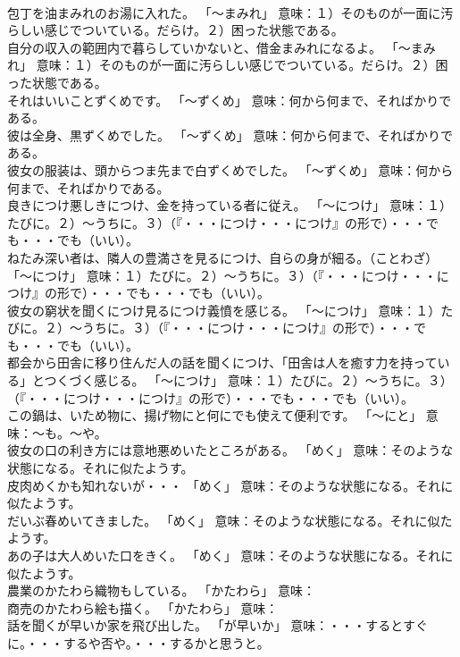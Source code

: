 \documentclass[8pt]{extreport}
\begin{document}
\begin{CJK}{UTF8}{min}
\\	包丁を油まみれのお湯に入れた。	「～まみれ」 意味：１）そのものが一面に汚らしい感じでついている。だらけ。２）困った状態である。	
\\	自分の収入の範囲内で暮らしていかないと、借金まみれになるよ。	「～まみれ」 意味：１）そのものが一面に汚らしい感じでついている。だらけ。２）困った状態である。	
\\	それはいいことずくめです。	「～ずくめ」 意味：何から何まで、そればかりである。	
\\	彼は全身、黒ずくめでした。	「～ずくめ」 意味：何から何まで、そればかりである。	
\\	彼女の服装は、頭からつま先まで白ずくめでした。	「～ずくめ」 意味：何から何まで、そればかりである。	
\\	良きにつけ悪しきにつけ、金を持っている者に従え。	「～につけ」 意味：１）たびに。２）～うちに。３）（『・・・につけ・・・につけ』の形で）・・・でも・・・でも（いい）。	
\\	ねたみ深い者は、隣人の豊満さを見るにつけ、自らの身が細る。（ことわざ）	「～につけ」 意味：１）たびに。２）～うちに。３）（『・・・につけ・・・につけ』の形で）・・・でも・・・でも（いい）。	
\\	彼女の窮状を聞くにつけ見るにつけ義憤を感じる。	「～につけ」 意味：１）たびに。２）～うちに。３）（『・・・につけ・・・につけ』の形で）・・・でも・・・でも（いい）。	
\\	都会から田舎に移り住んだ人の話を聞くにつけ、「田舎は人を癒す力を持っている」とつくづく感じる。	「～につけ」 意味：１）たびに。２）～うちに。３）（『・・・につけ・・・につけ』の形で）・・・でも・・・でも（いい）。	
\\	この鍋は、いため物に、揚げ物にと何にでも使えて便利です。	「～にと」 意味：～も。～や。	
\\	彼女の口の利き方には意地悪めいたところがある。	「めく」 意味：そのような状態になる。それに似たようす。	
\\	皮肉めくかも知れないが・・・	「めく」 意味：そのような状態になる。それに似たようす。	
\\	だいぶ春めいてきました。	「めく」 意味：そのような状態になる。それに似たようす。	
\\	あの子は大人めいた口をきく。	「めく」 意味：そのような状態になる。それに似たようす。	
\\	農業のかたわら織物もしている。	「かたわら」 意味：
\\	商売のかたわら絵も描く。	「かたわら」 意味：
\\	話を聞くが早いか家を飛び出した。	「が早いか」 意味：・・・するとすぐに。・・・するや否や。・・・するかと思うと。	

\end{CJK}
\end{document}

